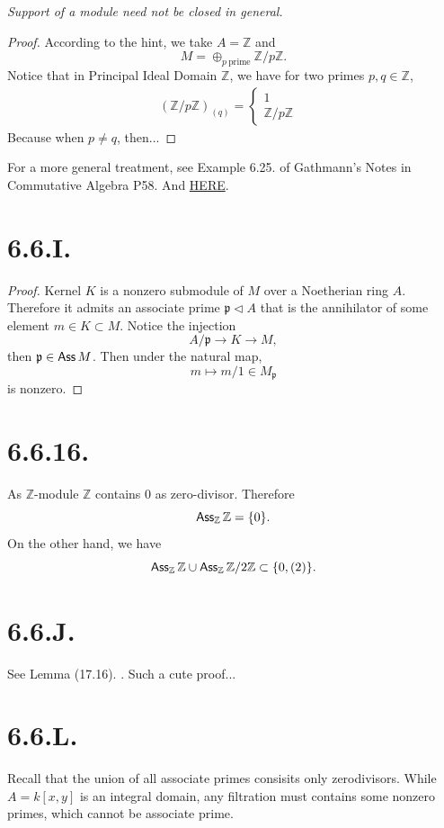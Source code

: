 \textit{Support of a module need not be closed in general.}
\begin{proof}
	According to the hint, we take $A=\mathbb Z$ and $$M=\oplus_{p ~\text{prime}}\mathbb Z/p\mathbb Z.$$
	Notice that in Principal Ideal Domain $\mathbb Z$, we have for two primes $p,q\in\mathbb Z$,
	\begin{align*}
		(\mathbb Z/p\mathbb Z)_{(q)}=\begin{cases}
										1 & \\
										\mathbb Z/p\mathbb Z & 
									\end{cases}
	\end{align*}
	Because when $p\neq q$, then...

\end{proof}

For a more general treatment, see Example 6.25. of Gathmann's Notes in Commutative Algebra P58. And \href{https://math.stackexchange.com/questions/4852147/what-are-the-localizations-of-mathbbz-n-mathbbz-at-prime-ideals-in-genera/4852148#4852148}{HERE}.

\section{6.6.I.}

\begin{proof}
Kernel $K$ is a nonzero submodule of $M$ over a Noetherian ring $A$. Therefore it admits an associate prime $\mathfrak p\triangleleft A$ that is the annihilator of some element $m\in K\subset M$. Notice the injection
\[A/\mathfrak p\to K\to M,\] then $\mathfrak p\in \operatorname{\mathsf{Ass}} M$. Then under the natural map, 
\[m\mapsto m/1 \in M_{\mathfrak p}\] is nonzero.
\end{proof}

\section{6.6.16.}

As $\mathbb Z$-module $\mathbb Z$ contains $0$ as zero-divisor. Therefore 
\[\operatorname{\mathsf{Ass}}_{\mathbb Z}\mathbb Z=\{0\}.\]
On the other hand, we have 
\[\operatorname{\mathsf{Ass}}_{\mathbb Z}\mathbb Z\cup \operatorname{\mathsf{Ass}}_{\mathbb Z}\mathbb Z/2\mathbb Z\subset \{0,(2)\}.\]

\section{6.6.J.}

See Lemma (17.16). \cite{altman2013term}. Such a cute proof...

\section{6.6.L.}

Recall that the union of all associate primes consisits only zerodivisors. While $A=k[x,y]$ is an integral domain, any filtration must contains some nonzero primes, which cannot be associate prime.